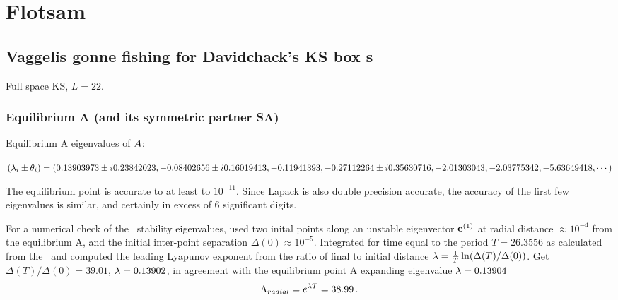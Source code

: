 %

\section{Flotsam}


\subsection{Vaggelis gonne fishing for Davidchack's KS box {\rpo s}}

Full space KS, $L=22$.

\subsubsection{Equilibrium A (and its symmetric partner SA)}

Equilibrium A eigenvalues of ${A}$:

$(\lambda_i \pm \theta_i)
=(
  0.13903973 \pm i 0.23842023,
 -0.08402656 \pm i 0.16019413,
 -0.11941393, 
 -0.27112264 \pm i 0.35630716,
 -2.01303043,
 -2.03775342,
 -5.63649418,
\cdots
)$


The equilibrium point is accurate to at least to $10^{-11}$. Since
Lapack is also double precision accurate, the accuracy of the first
few eigenvalues is similar, and certainly in
excess of 6 significant digits.



For a numerical check of the \rpo\ stability eigenvalues,
used two inital
points along an unstable eigenvector ${\bf e}^{(1)}$
at radial distance  $\approx 10^{-4}$ from the equilibrium A,
and the initial inter-point separation $\Delta(0) \approx 10^{-5}$.
Integrated for time equal to the period $T=26.3556$ as calculated from
the \jacobianM\ and computed the leading Lyapunov exponent from the ratio of
final to initial distance 
$\lambda= {1 \over T}\ln( \Delta(T)/\Delta(0))$.
Get
$\Delta(T)/\Delta(0) =39.01$,
$\lambda=0.13902$, in agreement with the equilibrium point A 
expanding eigenvalue $\lambda=0.13904$
\[
\Lambda_{radial} =  e^{\lambda T} =38.99
\,.
\]

